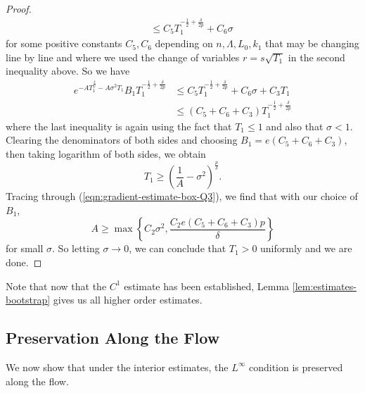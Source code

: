 \documentclass[12pt]{amsart}
\theoremstyle{plain}
\theoremstyle{plain}
\theoremstyle{definition}
\theoremstyle{remark}
\numberwithin{equation}{subsection}
\begin{document}
\begin{proof}
\begin{align*}
        &\quad\leq C_5T_1^{-\frac{1}{2}+\frac{\delta}{2p}} + C_6\sigma
    \end{align*}
    for some positive constants $C_5, C_6$ depending on $n, \Lambda, L_0, k_1$ that may be changing line by line and where we used the change of variables $r = s\sqrt{T_1}$ in the second inequality above. So we have
    \begin{align}\label{eqn:gradient-estimate-Q-heat-kernel-estimate4}
        e^{-AT_1^{\frac{\delta}{p}}-A\sigma^2T_1}B_1T_1^{-\frac{1}{2}+\frac{\delta}{2p}} &\leq C_5T_1^{-\frac{1}{2}+\frac{\delta}{2p}} + C_6\sigma + C_3 T_1\nonumber \\
        &\leq (C_5 + C_6 + C_3)T_1^{-\frac{1}{2}+\frac{\delta}{2p}}
    \end{align}
    where the last inequality is again using the fact that $T_1 \leq 1$ and also that $\sigma < 1$. Clearing the denominators of both sides and choosing $B_1 = e(C_5 + C_6 + C_3)$, then taking logarithm of both sides, we obtain
    \begin{equation*}
        T_1 \geq \left(\frac{1}{A}-\sigma^2\right)^{\frac{p}{\delta}}.
    \end{equation*}
    Tracing through (\ref{eqn:gradient-estimate-box-Q3}), we find that with our choice of $B_1$,
    \begin{equation*}
        A \geq \max\left\{ C_2\sigma^2, \frac{C_2e(C_5+C_6+C_3)p}{\delta}\right\}
    \end{equation*}
    for small $\sigma$. So letting $\sigma \to 0$, we can conclude that $T_1 > 0$ uniformly and we are done.
\end{proof}

Note that now that the $C^1$ estimate has been established, Lemma \ref{lem:estimates-bootstrap} gives us all higher order estimates.

\subsection{Preservation Along the Flow}

We now show that under the interior estimates, the $L^\infty$ condition is preserved along the flow.
\end{document}

